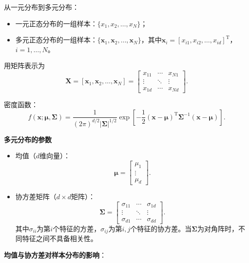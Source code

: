 \documentclass[11pt,a4paper]{report}
\theoremstyle{definition}
\begin{document}
从一元分布到多元分布：
\begin{itemize}[leftmargin=2em]
    \item 一元正态分布的一组样本：$\{x_{1},x_{2},\ldots,x_{N}\}$；
    \item 多元正态分布的一组样本：$\{\boldsymbol{x}_{1},\boldsymbol{x}_{2},\ldots,\boldsymbol{x}_{N}\}$，其中$\boldsymbol{x}_{i}=[x_{i1},x_{i2},\ldots,x_{id}]^{\mathrm{T}}$，$i=1,\ldots,N$。
\end{itemize}

用矩阵表示为
\[
\boldsymbol{X}=[\boldsymbol{x}_{1},\boldsymbol{x}_{2},\ldots,\boldsymbol{x}_{N}]
=
\left[\begin{matrix}
x_{11} & \cdots & x_{N1}\\
\vdots & \ddots & \vdots\\
x_{1d} & \cdots & x_{Nd}
\end{matrix}\right].
\]

密度函数：
\[
f(\boldsymbol{x};\boldsymbol{\mu},\boldsymbol{\Sigma})=\frac{1}{(2\pi)^{d/2}|\boldsymbol{\Sigma}|^{1/2}}
\exp\left[-\frac{1}{2}(\boldsymbol{x}-\boldsymbol{\mu})^{\mathrm{T}}\boldsymbol{\Sigma}^{-1}(\boldsymbol{x}-\boldsymbol{\mu})\right].
\]

\textbf{多元分布的参数}
\begin{itemize}[leftmargin=2em]
    \item 均值（$d$维向量）：
    \[
    \boldsymbol{\mu}=\left[\begin{matrix}\mu_{1}\\\vdots\\\mu_{d}\end{matrix}\right].
    \]
    \item 协方差矩阵（$d\times d$矩阵）：
    \[
    \boldsymbol{\Sigma}=\left[\begin{matrix}
    \sigma_{11} & \cdots & \sigma_{1d}\\
    \vdots & \ddots & \vdots\\
    \sigma_{d1} & \cdots & \sigma_{dd}
    \end{matrix}\right].
    \]
    其中$\sigma_{ii}$为第$i$个特征的方差，$\sigma_{ij}$为第$i,j$个特征的协方差。当$\boldsymbol{\Sigma}$为对角阵时，不同特征之间不具备相关性。
\end{itemize}

\textbf{均值与协方差对样本分布的影响}：
\end{document}
